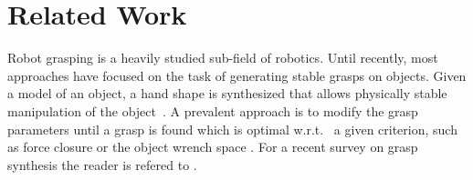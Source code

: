 \documentclass{aamas2015}
\begin{document}
%	
%	
\newpage
\section{Related Work}
Robot grasping is a heavily studied sub-field of robotics.
Until recently, most approaches have focused on the task 
of generating stable grasps on objects. Given a model of an object, a hand shape is synthesized 
that allows physically stable manipulation of the object~\cite{Klank2009, Kragic2001}.
A prevalent approach is to modify the grasp parameters 
until a grasp is found which is optimal w.r.t.~
a given criterion, such as force closure \cite{nguyen} or the 
object wrench space \cite{pollardphd}. For a recent survey 
on grasp synthesis the reader is refered to \cite{bohg}.
\end{document}
